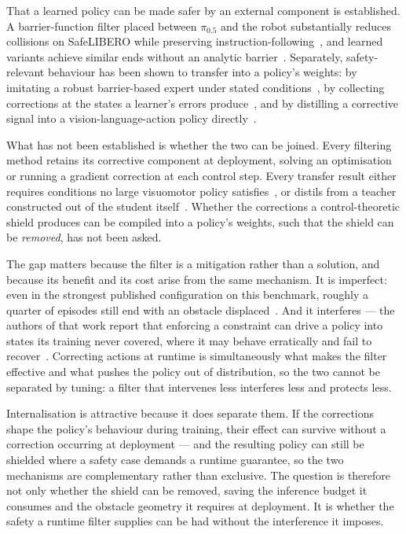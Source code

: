 \documentclass[a4paper,11pt]{report}
\begin{document}
That a learned policy can be made safer by an external component is established. A barrier-function
filter placed between $\pi_{0.5}$ and the robot substantially reduces collisions on SafeLIBERO while
preserving instruction-following~\cite{vlsa2026}, and learned variants achieve similar ends without
an analytic barrier~\cite{meng2024conbat,sun2025lpb}. Separately, safety-relevant behaviour has been
shown to transfer into a policy's weights: by imitating a robust barrier-based expert under stated
conditions~\cite{cosner2022il_cbf}, by collecting corrections at the states a learner's errors
produce~\cite{ciftci2025safegil,hoque2024intervengen}, and by distilling a corrective signal into a
vision-language-action policy directly~\cite{wang2026roadvla}.

What has not been established is whether the two can be joined. Every filtering method retains its
corrective component at deployment, solving an optimisation or running a gradient correction at each
control step. Every transfer result either requires conditions no large visuomotor policy
satisfies~\cite{cosner2022il_cbf}, or distils from a teacher constructed out of the student
itself~\cite{wang2026roadvla}. Whether the corrections a control-theoretic shield produces can be
compiled into a policy's weights, such that the shield can be \emph{removed}, has not been asked.

The gap matters because the filter is a mitigation rather than a solution, and because its benefit
and its cost arise from the same mechanism. It is imperfect: even in the strongest published
configuration on this benchmark, roughly a quarter of episodes still end with an obstacle
displaced~\cite{vlsa2026}. And it interferes --- the authors of that work report that enforcing a
constraint can drive a policy into states its training never covered, where it may behave
erratically and fail to recover~\cite{vlsa2026}. Correcting actions at runtime is simultaneously
what makes the filter effective and what pushes the policy out of distribution, so the two cannot be
separated by tuning: a filter that intervenes less interferes less and protects less.

Internalisation is attractive because it does separate them. If the corrections shape the policy's
behaviour during training, their effect can survive without a correction occurring at deployment ---
and the resulting policy can still be shielded where a safety case demands a runtime guarantee, so
the two mechanisms are complementary rather than exclusive. The question is therefore not only
whether the shield can be removed, saving the inference budget it consumes and the obstacle geometry
it requires at deployment. It is whether the safety a runtime filter supplies can be had without the
interference it imposes.
\end{document}
